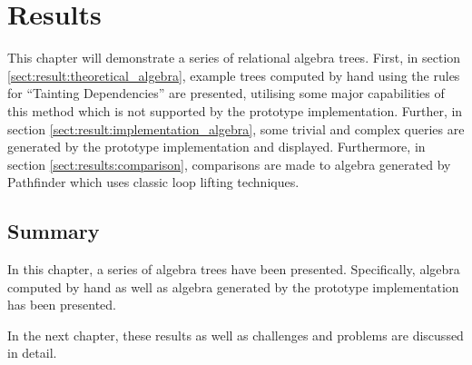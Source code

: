 \chapter{Results}
\label{chapter:results}
This chapter will demonstrate a series of relational algebra trees. First, in
section \ref{sect:result:theoretical_algebra}, example trees computed by hand
using the rules for ``Tainting Dependencies'' are presented, utilising
some major capabilities of this method which is not supported by the prototype
implementation. Further, in section \ref{sect:result:implementation_algebra},
some trivial and complex queries are generated by the prototype implementation
and displayed. Furthermore, in section \ref{sect:results:comparison},
comparisons are made to algebra generated by Pathfinder which uses classic
loop lifting techniques.




\section{Summary}
\label{sect:res:summary}
In this chapter, a series of algebra trees have been presented. Specifically,
algebra computed by hand as well as algebra generated by the prototype
implementation has been presented. 

In the next chapter, these results as well as challenges and problems are
discussed in detail.
